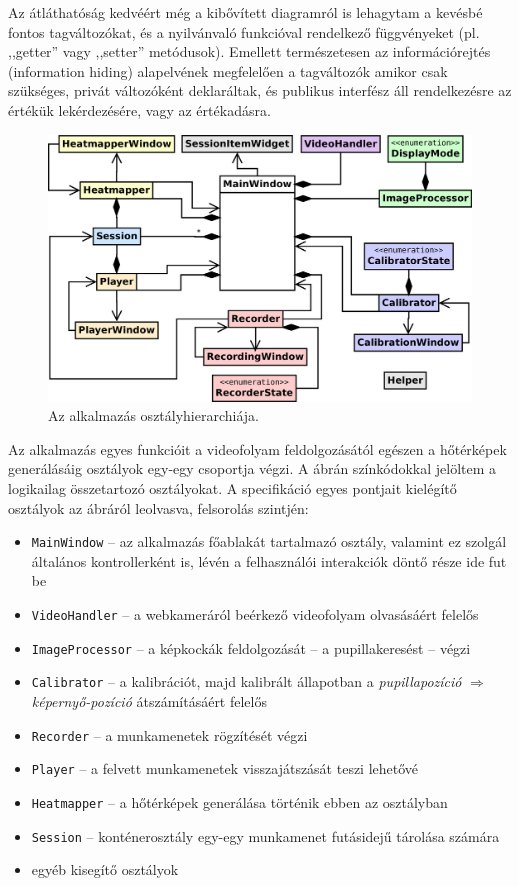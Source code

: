   Az átláthatóság kedvéért még a kibővített diagramról is lehagytam a kevésbé fontos tagváltozókat, és a nyilvánvaló funkcióval rendelkező függvényeket (pl. ,,getter'' vagy ,,setter'' metódusok). Emellett természetesen az információrejtés (information hiding) alapelvének megfelelően a tagváltozók amikor csak szükséges, privát változóként deklaráltak, és publikus interfész áll rendelkezésre az értékük lekérdezésére, vagy az értékadásra.

\begin{figure}[!ht]
\centering
\includegraphics[width=140mm, keepaspectratio]{figures/overview_aa.png}
\caption{Az alkalmazás osztályhierarchiája.}
\label{fig:overview}
\end{figure}

Az alkalmazás egyes funkcióit a videofolyam feldolgozásától egészen a hőtérképek generálásáig osztályok egy-egy csoportja végzi. A  ábrán színkódokkal jelöltem a logikailag összetartozó osztályokat. A specifikáció egyes pontjait kielégítő osztályok az ábráról leolvasva, felsorolás szintjén:

\begin{itemize}
  \item \texttt{MainWindow} -- az alkalmazás főablakát tartalmazó osztály, valamint ez szolgál általános kontrollerként is, lévén a felhasználói interakciók döntő része ide fut be
  \item \texttt{VideoHandler} -- a webkameráról beérkező videofolyam olvasásáért felelős
  \item \texttt{ImageProcessor} -- a képkockák feldolgozását -- a pupillakeresést -- végzi
  \item \texttt{Calibrator} -- a kalibrációt, majd kalibrált állapotban a \emph{pupillapozíció} $\Longrightarrow$ \emph{képernyő-pozíció} átszámításáért felelős
  \item \texttt{Recorder} -- a munkamenetek rögzítését végzi
  \item \texttt{Player} -- a felvett munkamenetek visszajátszását teszi lehetővé
  \item \texttt{Heatmapper} -- a hőtérképek generálása történik ebben az osztályban
  \item \texttt{Session} -- konténerosztály egy-egy munkamenet futásidejű tárolása számára
  \item egyéb kisegítő osztályok
\end{itemize}

